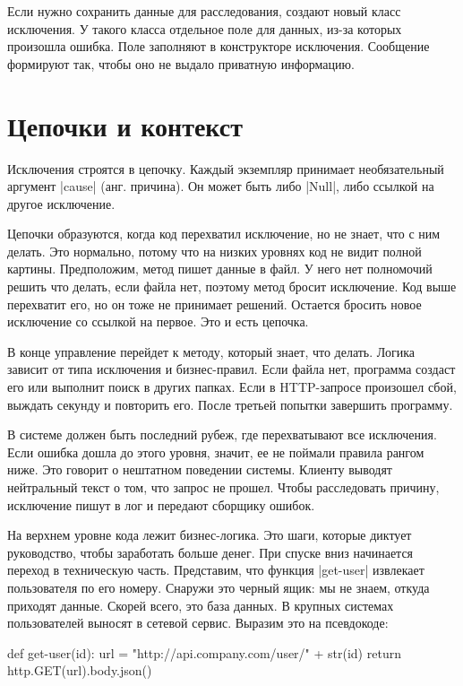 Если нужно сохранить данные для расследования, создают новый класс исключения. У
такого класса отдельное поле для данных, из-за которых произошла ошибка. Поле
заполняют в конструкторе исключения. Сообщение формируют так, чтобы оно не
выдало приватную информацию.

\section{Цепочки и контекст}

Исключения строятся в цепочку. Каждый экземпляр принимает необязательный
аргумент \spverb|cause| (анг. причина). Он может быть либо \spverb|Null|, либо
ссылкой на другое исключение.

Цепочки образуются, когда код перехватил исключение, но не знает, что с ним
делать. Это нормально, потому что на низких уровнях код не видит полной
картины. Предположим, метод пишет данные в файл. У него нет полномочий решить
что делать, если файла нет, поэтому метод бросит исключение. Код выше перехватит
его, но он тоже не принимает решений. Остается бросить новое исключение со
ссылкой на первое. Это и есть цепочка.

В конце управление перейдет к методу, который знает, что делать. Логика зависит
от типа исключения и бизнес-правил. Если файла нет, программа создаст его или
выполнит поиск в других папках. Если в HTTP-запросе произошел сбой, выждать
секунду и повторить его. После третьей попытки завершить программу.

В системе должен быть последний рубеж, где перехватывают все исключения. Если
ошибка дошла до этого уровня, значит, ее не поймали правила рангом ниже. Это
говорит о нештатном поведении системы. Клиенту выводят нейтральный текст о том,
что запрос не прошел. Чтобы расследовать причину, исключение пишут в лог и
передают сборщику ошибок.


На верхнем уровне кода лежит бизнес-логика. Это шаги, которые диктует
руководство, чтобы заработать больше денег. При спуске вниз начинается переход в
техническую часть. Представим, что функция \spverb|get-user| извлекает
пользователя по его номеру. Снаружи это черный ящик: мы не знаем, откуда
приходят данные. Скорей всего, это база данных. В крупных системах пользователей
выносят в сетевой сервис. Выразим это на псевдокоде:

\begin{english}
  \begin{python}
def get-user(id):
  url = "http://api.company.com/user/" + str(id)
  return http.GET(url).body.json()
  \end{python}
\end{english}

